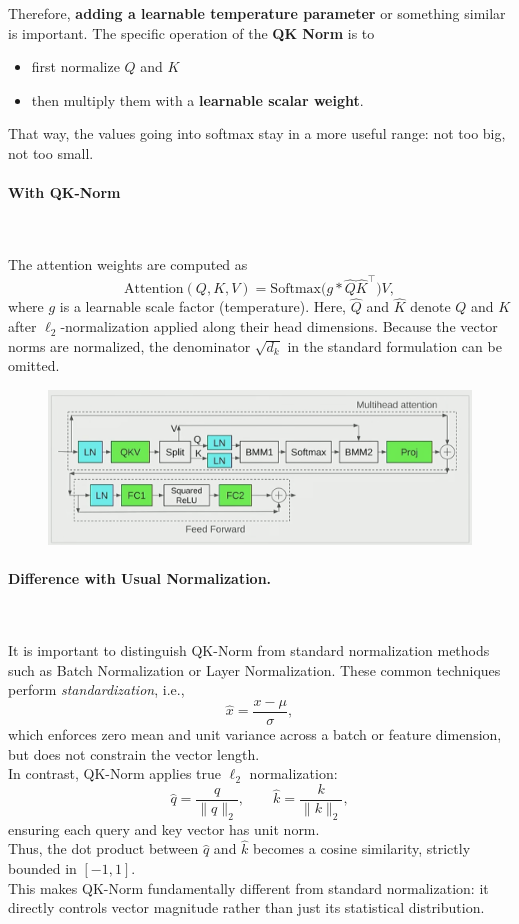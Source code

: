 Therefore, \textbf{adding a learnable temperature parameter} or something similar is important. The specific operation of the \textbf{QK Norm} is to 
\begin{itemize}
  \item first normalize $Q$ and $K$
  \item then multiply them with a \textbf{learnable scalar weight}.
\end{itemize}  

That way, the values going into softmax stay in a more useful range: not too big, not too small.
\paragraph{With QK-Norm}~{}

The attention weights are computed as
\[
    \mathrm{Attention}(Q,K,V) 
    = \mathrm{Softmax} \big( g * \hat Q \hat K^\top \big) V,
\]
where $g$ is a learnable scale factor (temperature).  
Here, $\hat Q$ and $\hat K$ denote $Q$ and $K$ after $\ell_2$-normalization applied along their head dimensions.  
Because the vector norms are normalized, the denominator $\sqrt{d_k}$ in the standard formulation can be omitted.

\begin{figure}[htbp]
  \centering
  \includegraphics[width=0.7\linewidth]{figs/lec3/lec3.31.png}
\end{figure}

\paragraph{Difference with Usual Normalization.}~{}

It is important to distinguish QK-Norm from standard normalization methods such as Batch Normalization or Layer Normalization.  
These common techniques perform \emph{standardization}, i.e.,
\[
    \hat x = \frac{x - \mu}{\sigma},
\]
which enforces zero mean and unit variance across a batch or feature dimension, but does not constrain the vector length.  \\
In contrast, QK-Norm applies true $\ell_2$ normalization:
\[
    \hat q = \frac{q}{\|q\|_2}, \qquad \hat k = \frac{k}{\|k\|_2},
\]
ensuring each query and key vector has unit norm.  \\
Thus, the dot product between $\hat q$ and $\hat k$ becomes a cosine similarity, strictly bounded in $[-1,1]$.  \\
This makes QK-Norm fundamentally different from standard normalization: it directly controls vector magnitude rather than just its statistical distribution.



